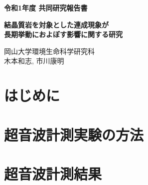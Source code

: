 ﻿\documentclass[11pt,a4j]{jarticle}
\newlength{\minitwocolumn}
\begin{document}
\newcommand{\fat}[1]{\mbox{\boldmath $#1$}}
\newcommand{\D}{\partial}
\newcommand{\w}{\omega}
\newcommand{\ga}{\alpha}
\newcommand{\gb}{\beta}
\newcommand{\gx}{\xi}
\newcommand{\gz}{\zeta}
\newcommand{\vhat}[1]{\hat{\fat{#1}}}
\newcommand{\spc}{\vspace{0.7\baselineskip}}
\newcommand{\halfspc}{\vspace{0.3\baselineskip}}

\newcommand{\twofig}[2]
 {
   \begin{figure}[h]
     \begin{minipage}[t]{\minitwocolumn}
         \begin{center}   #1
         \end{center}
     \end{minipage}
         \hspace{\columnsep}
     \begin{minipage}[t]{\minitwocolumn}
         \begin{center} #2
         \end{center}
     \end{minipage}
   \end{figure}
 }
\begin{center}
{\Large \bf 令和1年度 共同研究報告書}
\end{center}
\vspace{2mm}
\begin{center}
{\LARGE \bf 結晶質岩を対象とした連成現象が\\
長期挙動におよぼす影響に関する研究} 
\end{center}
\begin{center}
岡山大学環境生命科学研究科\\
木本和志, 市川康明
\end{center}
\vspace{10mm}
\section{はじめに}

\section{超音波計測実験の方法}

\section{超音波計測結果}

\end{document}
